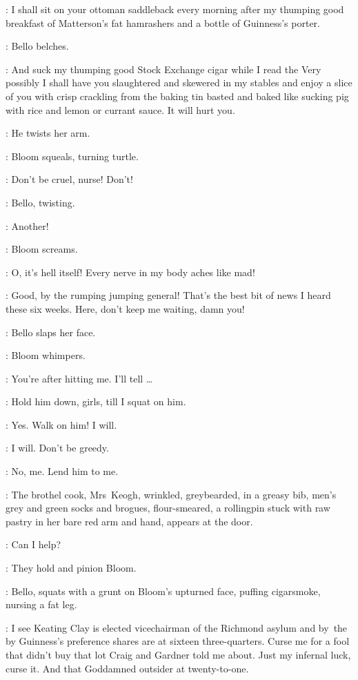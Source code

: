 \Bello:
I shall sit on your ottoman saddleback every morning after
my thumping good breakfast of Matterson's fat hamrashers
and a bottle of Guinness's porter.

:
Bello belches.

\Bello:
And suck my thumping good Stock Exchange cigar
while I read the 
Very possibly I shall have you slaughtered and skewered in my stables
and enjoy a slice of you with crisp crackling from the baking tin
basted and baked like sucking pig with rice and lemon or currant sauce.
It will hurt you.

:
He twists her arm.

:
Bloom squeals, turning turtle.

\Bloom:
Don't be cruel, nurse!
Don't!

:
Bello, twisting.

\Bello:
Another!

:
Bloom screams.

\Bloom:
O, it's hell itself!
Every nerve in my body aches like mad!

\Bello:
Good, by the rumping jumping general!
That's the best bit of news I heard these six weeks.
Here, don't keep me waiting, damn you!

:
Bello slaps her face.

:
Bloom whimpers.

\Bloom:
You're after hitting me.
I'll tell \ldots

\Bello:
Hold him down, girls, till I squat on him.

\Zoe:
Yes.
Walk on him!
I will.

\Florry:
I will.
Don't be greedy.

\Kitty:
No, me.
Lend him to me.

:
The brothel cook, Mrs~Keogh, wrinkled, greybearded, in a greasy bib,
men's grey and green socks and brogues, flour-smeared,
a rollingpin stuck with raw pastry in her bare red arm and hand,
appears at the door.

\MrsKeogh:
Can I help?

:
They hold and pinion Bloom.

:
Bello, squats with a grunt on Bloom's upturned face,
puffing cigarsmoke, nursing a fat leg.

\Bello:
I see Keating Clay is elected vicechairman of the Richmond asylum
and by~the by Guinness's preference shares are at sixteen three-quarters.
Curse me for a fool that didn't buy that lot Craig and Gardner told me about.
Just my infernal luck, curse it.
And that Goddamned outsider  at twenty-to-one.

